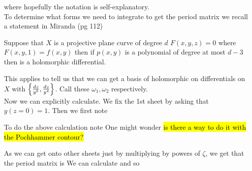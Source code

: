 \documentclass{article}
\begin{document}
where hopefully the notation is self-explanatory. \\
To determine what forms we need to integrate to get the period matrix we recall a statement in Miranda (pg 112)
\begin{lemma}
	Suppose that $X$ is a projective plane curve of degree $d$ $F(x,y,z)=0$ where $F(x,y,1)=f(x,y)$ then if $p(x,y)$ is a polynomial of degree at most $d-3$ then 
is a holomorphic differential. 
\end{lemma}
This applies to tell us that we can get a basis of holomorphic on differentials on $X$ with $\left\{ \frac{dz}{y^5}, \frac{dz}{y^4} \right\}$. Call these $\omega_1, \omega_2$ respectively. \\
Now we can explicitly calculate. We fix the 1st sheet by asking that $y(z=0)=1$. Then we first note 
\begin{remark}
	To do the above calculation note 
One might wonder \hl{is there a way to do it with the Pochhammer contour?}
\end{remark}
As we can get onto other sheets just by multiplying by powers of $\zeta$, we get that the period matrix is 
We can calculate 
and so 
\end{document}
